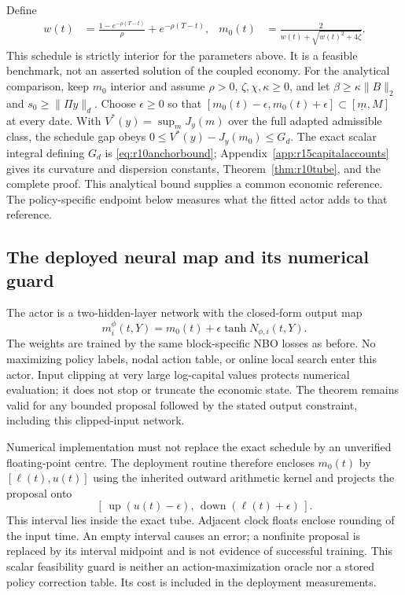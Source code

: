 Define
\begin{align}
 w(t)&=\frac{1-e^{-\rho(T-t)}}{\rho}+e^{-\rho(T-t)},&
 m_0(t)&=\frac{2}{w(t)+\sqrt{w(t)^2+4\zeta}}.\label{eq:r10anchor}
\end{align}
This schedule is strictly interior for the parameters above. It is a feasible benchmark, not an asserted solution of the coupled economy. 
For the analytical comparison, keep $m_0$ interior and assume
$\rho>0$, $\zeta,\chi,\kappa\geq0$,
and let $\beta\geq\kappa\|B\|_2$ and $s_0\geq\|\Pi y\|_d$.
Choose $\epsilon\geq0$ so that
$[m_0(t)-\epsilon,m_0(t)+\epsilon]\subset[\underline m,M]$
at every date.
With $V^*(y)=\sup_m J_y(m)$ over the full adapted admissible class,
the schedule gap obeys
$0\leq V^*(y)-J_y(m_0)\leq G_d$. The exact scalar integral defining $G_d$
is \eqref{eq:r10anchorbound}; Appendix~\ref{app:r15capitalaccounts}
gives its curvature and dispersion constants, Theorem~\ref{thm:r10tube},
and the complete proof. This analytical bound supplies a common economic
reference. The policy-specific endpoint below measures what the fitted actor
adds to that reference.

\subsection{The deployed neural map and its numerical guard}
The actor is a two-hidden-layer network with the closed-form output map
\begin{equation}\label{eq:r10actor}
 m_i^\phi(t,Y)=m_0(t)+\epsilon\tanh N_{\phi,i}(t,Y).
\end{equation}
The weights are trained by the same block-specific NBO losses as before. No maximizing policy labels, nodal action table, or online local search enter this actor. Input clipping at very large log-capital values protects numerical evaluation; it does not stop or truncate the economic state. The theorem remains valid for any bounded proposal followed by the stated output constraint, including this clipped-input network.

Numerical implementation must not replace the exact schedule by an unverified floating-point centre. The deployment routine therefore encloses $m_0(t)$ by $[\ell(t),u(t)]$ using the inherited outward arithmetic kernel and projects the proposal onto
\begin{equation}\label{eq:r10inward}
 [\,\operatorname{up}(u(t)-\epsilon),\,
       \operatorname{down}(\ell(t)+\epsilon)\,].
\end{equation}
This interval lies inside the exact tube. Adjacent clock floats enclose rounding of the input time. An empty interval causes an error; a nonfinite proposal is replaced by its interval midpoint and is not evidence of successful training. This scalar feasibility guard is neither an action-maximization oracle nor a stored policy correction table. Its cost is included in the deployment measurements.

